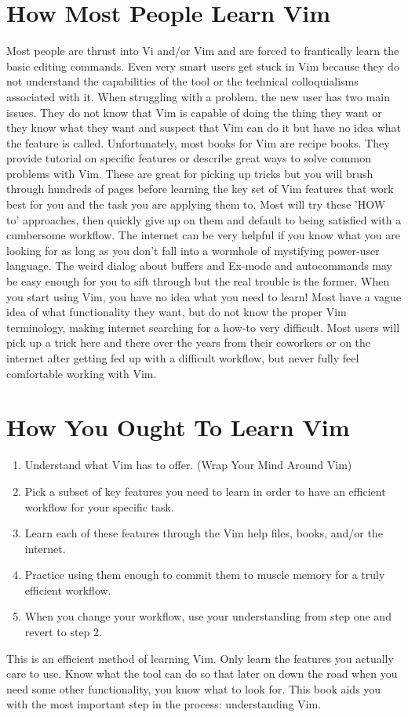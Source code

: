 \documentclass[12pt, oneside]{book}
\begin{document}
\section{How Most People Learn Vim}
Most people are thrust into Vi and/or Vim and are forced to frantically learn the basic editing commands.  Even very smart users get stuck in Vim because they do not understand the capabilities of the
tool or the technical colloquialisms associated with it.  When struggling with a problem, the new user has two main issues.  They do not know that Vim is capable of doing the thing they want or they
know what they want and suspect that Vim can do it but have no idea what the feature is called.  Unfortunately, most books for Vim are recipe books.  They provide tutorial on specific features or
describe great ways to solve common problems with Vim.  These are great for picking up tricks but you will brush through hundreds of pages before learning the key set of Vim features that work best
for you and the task you are applying them to.  Most will try these 'HOW to' approaches, then quickly give up on them and default to being satisfied with a cumbersome workflow.  The internet can be
very helpful if you know what you are looking for as long as you don't fall into a wormhole of mystifying power-user language.  The weird dialog about buffers and Ex-mode and autocommands may be easy
enough for you to sift through but the real trouble is the former.  When you start using Vim, you have no idea what you need to learn!  Most have a vague idea of what functionality they want, but do not know the proper Vim terminology, making internet searching for a how-to very difficult.  Most users will pick up a trick here and there over the years from their coworkers or on the internet after getting fed up with a difficult workflow, but never fully feel comfortable working with Vim.

\section{How You Ought To Learn Vim}
\begin{enumerate}
\item Understand what Vim has to offer. (Wrap Your Mind Around Vim)
\item Pick a subset of key features you need to learn in order to have an efficient workflow for your specific task.
\item Learn each of these features through the Vim help files, books, and/or the internet.
\item Practice using them enough to commit them to muscle memory for a truly efficient workflow.
\item When you change your workflow, use your understanding from step one and revert to step 2.
\end{enumerate}
This is an efficient method of learning Vim.  Only learn the features you actually care to use.  Know what the tool can do so that later on down the road when you need some other functionality, you
know what to look for.  This book aids you with the most important step in the process: understanding Vim.
\end{document}
